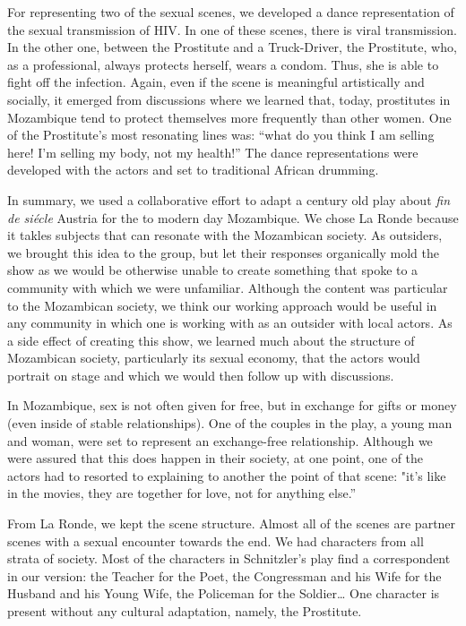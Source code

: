 \documentclass[article,twocolumn]{memoir}
\begin{document}
For representing two of the sexual scenes, we developed a dance representation
of the sexual transmission of HIV. In one of these scenes, there is viral
transmission. In the other one, between the Prostitute and a Truck-Driver, the
Prostitute, who, as a professional, always protects herself, wears a condom.
Thus, she is able to fight off the infection. Again, even if the scene is
meaningful artistically and socially, it emerged from discussions where we
learned that, today, prostitutes in Mozambique tend to protect themselves
more frequently than other women. One of the Prostitute's most resonating lines
was: ``what do you think I am selling here! I'm selling my body, not my
health!'' The dance representations were developed with the actors and set to
traditional African drumming.

\bigskip
\bigskip
\bigskip

In summary, we used a collaborative effort to adapt a century old play about
\textit{fin de si\'{e}cle} Austria for the to modern day Mozambique. We chose
La Ronde because it takles subjects that can resonate with the Mozambican
society. As outsiders, we brought this idea to the group, but let their
responses organically mold the show as we would be otherwise unable to create
something that spoke to a community with which we were unfamiliar. Although the
content was particular to the Mozambican society, we think our working approach
would be useful in any community in which one is working with as an outsider
with local actors. As a side effect of creating this show, we learned much
about the structure of Mozambican society, particularly its sexual economy,
that the actors would portrait on stage and which we would then follow up with
discussions.

In Mozambique, sex is not often given for free, but in exchange for gifts or
money (even inside of stable relationships). One of the couples in the play, a
young man and woman, were set to represent an exchange-free relationship.
Although we were assured that this does happen in their society, at one point,
one of the actors had to resorted to explaining to another the point of that
scene: "it's like in the movies, they are together for love, not for anything
else.''

From La Ronde, we kept the scene structure. Almost all of the scenes are
partner scenes with a sexual encounter towards the end. We had characters from
all strata of society. Most of the characters in Schnitzler's play find a
correspondent in our version: the Teacher for the Poet, the Congressman and his
Wife for the Husband and his Young Wife, the Policeman for the Soldier\ldots
One character is present without any cultural adaptation, namely, the
Prostitute.
\end{document}
